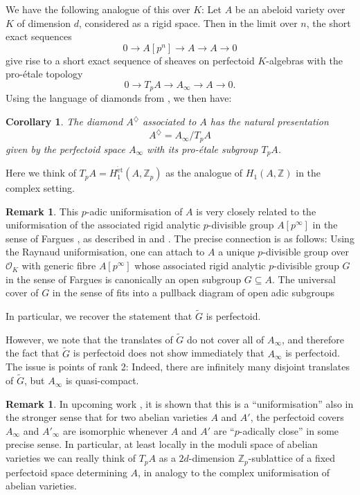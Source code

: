 \documentclass[10pt,oneside]{amsart}
\newtheorem{corollary}[theorem]{Corollary}
\theoremstyle{definition}
\newtheorem{remark}[theorem]{Remark}
\newcommand{\et}{\operatorname{\acute{e}t}}
\newcommand{\Z}{\mathbb{Z}}
\begin{document}
	We have the following analogue of this over $K$: Let $A$ be an abeloid variety over $K$ of dimension $d$, considered as a rigid space. Then in the limit over $n$, the short exact sequences
	\[ 0\to A[p^n]\to A\to A\to 0\]
	give rise to a short exact sequence of sheaves on perfectoid $K$-algebras with the pro-\'etale topology
	\[0\to T_pA \to A_\infty \to A\to 0.\]
	Using the language of diamonds from \cite[\S11]{etale_cohomology_of_diamonds}, we then have:
	\begin{corollary}
		The diamond $A^{\diamondsuit}$ associated to $A$ has the natural presentation
		\[A^{\diamondsuit} = A_\infty/T_pA \]
		given by the perfectoid space $A_\infty$ with its pro-\'etale subgroup $T_pA$.
	\end{corollary}
	Here we think of $T_pA=H^{\et}_1(A,\Z_p)$ as the analogue of $H_1(A,\Z)$ in the complex setting.
\begin{remark}
	This $p$-adic uniformisation of $A$ is very closely related to the uniformisation of the associated rigid analytic $p$-divisible group $A[p^\infty]$ in the sense of Fargues \cite{Fargues-groupes-analytiques}, as described in \cite[\S4.4]{survey} and \cite[Proposition 3.1.3]{SW}. The precise connection is as follows: Using the Raynaud uniformisation, one can attach to $A$ a unique $p$-divisible group over $\mathcal O_K$ with generic fibre $A[p^\infty]$ whose associated rigid analytic $p$-divisible group $G$ in the sense of Fargues is canonically an open subgroup $G\subseteq A$. The universal cover of $G$ in the sense of \cite[\S 3.1]{SW} fits into a pullback diagram of open adic subgroups
	\begin{center}
	\end{center}
	In particular, we recover the statement that $\widetilde{G}$ is perfectoid. 
	
	However, we note that the translates of $\widetilde{G}$ do not cover all of $A_\infty$, and therefore the fact that $\widetilde{G}$ is perfectoid does not show immediately that $A_\infty$ is perfectoid.  The issue is points of rank 2: Indeed, there are infinitely many disjoint translates of $\widetilde G$, but $A_\infty$ is quasi-compact.
\end{remark}
	\begin{remark}
	In upcoming work \cite{heuer-isoclasses}, it is shown that this is a  ``uniformisation'' also in the stronger sense that for two abelian varieties $A$ and $A'$, the perfectoid covers $A_\infty$ and $A'_\infty$ are isomorphic whenever $A$ and $A'$ are ``$p$-adically close'' in some precise sense. In particular, at least locally in the moduli space of abelian varieties we can really think of $T_pA$ as a $2d$-dimension $\mathbb Z_p$-sublattice of a fixed perfectoid space determining $A$, in analogy to the complex uniformisation of abelian varieties.
	\end{remark}
\end{document}
